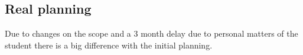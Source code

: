 %
%
%
%






\subsection{Real planning}
Due to changes on the scope and a 3 month delay due to personal matters of the student there is a big difference with the initial planning.

\newcommand{\PStart}{2018-11-01}
\newcommand{\FBeginning}{2018-11-07}
\newcommand{\SIncrementoUnoInicial}{2018-11-08}
\newcommand{\FIncrementoUnoInicial}{2018-12-05}
\newcommand{\FPause}{2019-02-25}
\newcommand{\FComeback}{2019-02-28}
\newcommand{\FIncrementoUnoFinal}{2019-05-05}
\newcommand{\SClosing}{2019-06-29}
\newcommand{\PClosing}{2019-07-17}


